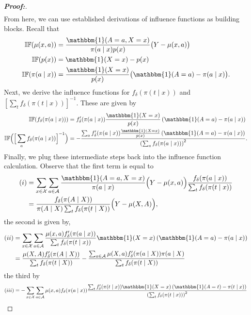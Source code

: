 \documentclass[11pt,twoside]{article}
\theoremstyle{definition}
\theoremstyle{remark}
\begin{document}
\begin{proof}[\textbf{Proof:}]
\begin{align*}
\end{align*}
From here, we can use established derivations of influence functions as building blocks. Recall that
\begin{align*}
    \mathbb{IF}(\mu(x, a)) &= \frac{\mathbbm{1}(A = a, X=x)}{\pi(a \mid x) p(x)} \big( Y - \mu(x, a) \big) \\
    \mathbb{IF}(p(x)) &= \mathbbm{1}(X = x) - p(x) \\
    \mathbb{IF}(\pi(a \mid x)) &= \frac{\mathbbm{1}(X = x)}{p(x)} \big( \mathbbm{1}(A = a) - \pi(a \mid x) \big).
\end{align*}
Next, we derive the influence functions for $f_\delta(\pi(t \mid x))$ and $[\sum_t f_\delta(\pi(t \mid x))]^{-1}$. These are given by
\begin{align*}
    \mathbb{IF}(f_\delta(\pi(a \mid x))) &= f^{\prime}_\delta(\pi(a \mid x)) \frac{\mathbbm{1}(X = x)}{p(x)} \left( \mathbbm{1}(A = a) - \pi(a \mid x) \right) \\
    \mathbb{IF}\Big(\Big[\sum_a f_\delta(\pi(a \mid x)) \Big]^{-1}\Big) &= - \frac{\sum_a f^{\prime}_\delta(\pi(a \mid x))\frac{\mathbbm{1}(X = x)}{p(x)} \left( \mathbbm{1}(A = a) - \pi(a \mid x) \right) }{\left(\sum_a f_\delta(\pi(a \mid x)) \right)^2}.
\end{align*}
Finally, we plug these intermediate steps back into the influence function calculation. Observe that the first term is equal to
\begin{align*}
    (i)  &= \sum_{x \in \mathcal{X}} \sum_{a \in \mathcal{A}}  \frac{\mathbbm{1}(A = a, X=x)}{\pi(a \mid x)} \Big( Y - \mu(x, a) \Big)  \frac{f_\delta(\pi(a \mid x))}{\sum_t f_\delta(\pi(t \mid x))} \\
    &=  \frac{f_\delta(\pi(A \mid X))}{\pi(A \mid X) \sum_t f_\delta(\pi(t \mid X))} \Big( Y - \mu(X, A) \Big),
\end{align*}
the second is given by,
\begin{align*}
    (ii)  &= \sum_{x \in \mathcal{X}} \sum_{a \in \mathcal{A}} \frac{\mu(x, a) f^{\prime}_\delta(\pi(a \mid x))}{\sum_t f_\delta(\pi(t \mid x))} \mathbbm{1}(X = x) \left( \mathbbm{1}(A = a) - \pi(a \mid x) \right) \\
    &=  \frac{\mu(X, A) f^{\prime}_\delta(\pi(A \mid X))}{\sum_t f_\delta(\pi(t \mid X))}  -   \frac{\sum_{a \in \mathcal{A}} \mu(X, a) f^{\prime}_\delta(\pi(a \mid X)) \pi(a \mid X) }{\sum_t f_\delta(\pi(t \mid X))}   
\end{align*}
the third by
\begin{align*}
    (iii) &=  - \sum_{x \in \mathcal{X}} \sum_{a \in \mathcal{A}} \mu(x, a) f_\delta(\pi(a \mid x)) \frac{\sum_t f^{\prime}_\delta(\pi(t \mid x))\mathbbm{1}(X = x) \left( \mathbbm{1}(A = t) - \pi(t \mid x) \right) }{\left(\sum_t f_\delta(\pi(t \mid x)) \right)^2} \\

\end{align*}
\end{proof}
\end{document}
